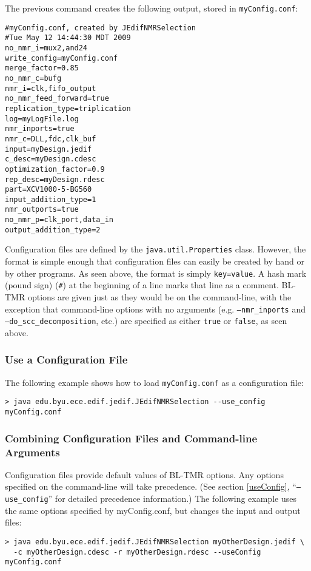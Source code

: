 The previous command creates the following output, stored in 
\texttt{myConfig.conf}:

\begin{verbatim}
#myConfig.conf, created by JEdifNMRSelection
#Tue May 12 14:44:30 MDT 2009
no_nmr_i=mux2,and24
write_config=myConfig.conf
merge_factor=0.85
no_nmr_c=bufg
nmr_i=clk,fifo_output
no_nmr_feed_forward=true
replication_type=triplication
log=myLogFile.log
nmr_inports=true
nmr_c=DLL,fdc,clk_buf
input=myDesign.jedif
c_desc=myDesign.cdesc
optimization_factor=0.9
rep_desc=myDesign.rdesc
part=XCV1000-5-BG560
input_addition_type=1
nmr_outports=true
no_nmr_p=clk_port,data_in
output_addition_type=2
\end{verbatim}

Configuration files are defined by the \texttt{java.util.Properties} class. 
However, the format is simple enough that configuration files can easily be 
created by hand or by other programs. As seen above, the format is simply 
\texttt{key=value}. A hash mark (pound sign) (\texttt{\#}) at the beginning of 
a line marks that line as a comment. BL-TMR options are given just as they would 
be on the command-line, with the exception that command-line options with no 
arguments (e.g. \texttt{--nmr\_inports} and \texttt{--do\_scc\_decomposition},
etc.) are specified as either \texttt{true} or \texttt{false}, as seen above.

\subsubsection{Use a Configuration File}

The following example shows how to load \texttt{myConfig.conf} as a configuration
file:

\begin{verbatim}
> java edu.byu.ece.edif.jedif.JEdifNMRSelection --use_config myConfig.conf
\end{verbatim}

\subsubsection{Combining Configuration Files and Command-line Arguments}
Configuration files provide default values of BL-TMR options. Any options 
specified on the command-line will take precedence. (See section 
\ref{useConfig}, ``\texttt{--use\_config}'' for detailed precedence
information.) The following example uses the same options specified by
myConfig.conf, but changes the input and output files:

\begin{verbatim}
> java edu.byu.ece.edif.jedif.JEdifNMRSelection myOtherDesign.jedif \
  -c myOtherDesign.cdesc -r myOtherDesign.rdesc --useConfig myConfig.conf
\end{verbatim}

